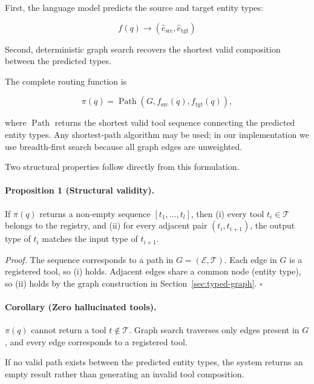 First, the language model predicts the source and target entity types:

\begin{equation}
    f(q)
    \rightarrow
    (\hat e_{\mathrm{src}},
     \hat e_{\mathrm{tgt}})
    \label{eq:type-prediction}
\end{equation}

Second, deterministic graph search recovers the shortest valid composition between the predicted types.

The complete routing function is

\begin{equation}
    \pi(q)
    =
    \operatorname{Path}
    \left(
        G,
        f_{\mathrm{src}}(q),
        f_{\mathrm{tgt}}(q)
    \right),
    \label{eq:routing-function}
\end{equation}

where $\operatorname{Path}$ returns the shortest valid tool sequence connecting the predicted entity types.
Any shortest-path algorithm may be used; in our implementation we use breadth-first search because all graph edges are unweighted.

Two structural properties follow directly from this formulation.

\paragraph{Proposition 1 (Structural validity).}
If $\pi(q)$ returns a non-empty sequence $[t_1, \ldots, t_l]$, then (i) every tool $t_i \in \mathcal{T}$ belongs to the registry, and (ii) for every adjacent pair $(t_i, t_{i+1})$, the output type of $t_i$ matches the input type of $t_{i+1}$.

\emph{Proof.}
The sequence corresponds to a path in $G = (\mathcal{E}, \mathcal{T})$.
Each edge in $G$ is a registered tool, so (i) holds.
Adjacent edges share a common node (entity type), so (ii) holds by the graph construction in Section~\ref{sec:typed-graph}. \hfill $\square$

\paragraph{Corollary (Zero hallucinated tools).}
$\pi(q)$ cannot return a tool $t \notin \mathcal{T}$.
Graph search traverses only edges present in $G$, and every edge corresponds to a registered tool.

If no valid path exists between the predicted entity types, the system returns an empty result rather than generating an invalid tool composition.

